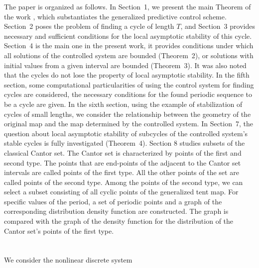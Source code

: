 \documentclass[12pt,a4paper]{amsart}
\begin{document}
The paper is organized as follows. In Section~1, we present the main Theorem of the work \cite{DSI}, which substantiates the generalized 
predictive control scheme. Section~2 poses the problem of finding a cycle of length $T$, and Section~3 provides necessary and sufficient conditions 
for the local asymptotic stability of this cycle. Section~4 is the main one in the present work, it provides conditions under which all solutions 
of the controlled system are bounded (Theorem~2), or solutions with initial values from a given interval are bounded (Theorem~3). It was also 
noted that the cycles do not lose the property of local asymptotic stability. In the fifth section, some computational particularities of using 
the control system for finding cycles are considered, the necessary conditions for the found periodic sequence to be a cycle are given. 
In the sixth section, using the example of stabilization of cycles of small lengths, we consider the relationship between the geometry of the original 
map and the map determined by the controlled system. In Section~7, the question about local asymptotic stability of subcycles of the controlled 
system's stable cycles is fully investigated (Theorem~4). Section 8 studies subsets of the classical Cantor set. The Cantor set is characterized by 
points of the first and second type. The points that are end-points of the adjacent to the Cantor set intervals are called points of the first type. 
All the other points of the set are called points of the second type. Among the points of the second type, we can select a subset consisting 
of all cyclic points of the generalized tent map. For specific values of the period, a set of periodic points and a graph of the corresponding 
distribution density function are constructed. The graph is compared with the graph of the density function for the distribution of the Cantor 
set's points of the first type.


\section{}

We consider the nonlinear discrete system 
\end{document}
